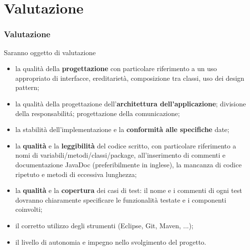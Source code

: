 \documentclass{beamer}
\begin{document}
\section{Valutazione}
\begin{frame}
\frametitle{Valutazione}

Saranno oggetto di valutazione
\begin{itemize}
\item la qualit\` a della \textbf{progettazione} con particolare riferimento a
  un uso appropriato di interfacce, ereditariet\`a, composizione tra
  classi, uso dei design pattern;
\item la qualit\` a della progettazione dell'\textbf{architettura
  dell'applicazione}; divisione della responsabilit\'a; progettazione
  della comunicazione;
\item la stabilit\` a dell'implementazione e la \textbf{conformit\` a alle
  specifiche} date; 
\item la \textbf{qualit\` a} e la \textbf{leggibilit\` a} del codice scritto, con
  particolare riferimento a nomi di variabili/metodi/classi/package,
  all'inserimento di commenti e documentazione JavaDoc
  (preferibilmente in inglese), la mancanza di codice ripetuto e
  metodi di eccessiva lunghezza;
\item la \textbf{qualit\` a} e la \textbf{copertura} dei casi di test: il nome e i
  commenti di ogni test dovranno chiaramente specificare le funzionalit\`
  a testate e i componenti coinvolti;
 \item il corretto utilizzo degli strumenti (Eclipse, Git, Maven, ...);
\item il livello di autonomia e impegno nello svolgimento del progetto.
\end{itemize}
\end{frame}
\end{document}
